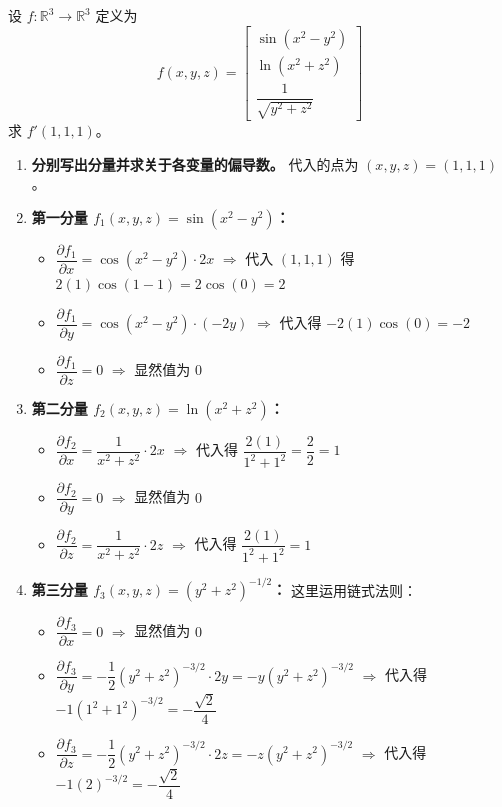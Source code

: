 \documentclass[lang=cn,11pt]{elegantbook}
\begin{document}
\begin{exercise}
设 $f:\mathbb{R}^3\to\mathbb{R}^3$ 定义为 
\[
f(x,y,z) = \begin{bmatrix} \sin(x^2-y^2) \\ \ln(x^2+z^2) \\ \dfrac{1}{\sqrt{y^2+z^2}} \end{bmatrix}
\]
求 $f'(1,1,1)$。
\end{exercise}
\begin{solution}
\begin{enumerate}
  \item \textbf{分别写出分量并求关于各变量的偏导数。}
  代入的点为 $(x, y, z) = (1, 1, 1)$。
  
  \item \textbf{第一分量 $f_1(x,y,z) = \sin(x^2-y^2)$：}
  \begin{itemize}
    \item $\dfrac{\partial f_1}{\partial x} = \cos(x^2-y^2) \cdot 2x$ \quad $\Rightarrow$ \quad 代入 $(1,1,1)$ 得 $2(1)\cos(1-1) = 2\cos(0) = 2$
    \item $\dfrac{\partial f_1}{\partial y} = \cos(x^2-y^2) \cdot (-2y)$ \quad $\Rightarrow$ \quad 代入得 $-2(1)\cos(0) = -2$
    \item $\dfrac{\partial f_1}{\partial z} = 0$ \quad $\Rightarrow$ \quad 显然值为 $0$
  \end{itemize}
  
  \item \textbf{第二分量 $f_2(x,y,z) = \ln(x^2+z^2)$：}
  \begin{itemize}
    \item $\dfrac{\partial f_2}{\partial x} = \dfrac{1}{x^2+z^2} \cdot 2x$ \quad $\Rightarrow$ \quad 代入得 $\dfrac{2(1)}{1^2+1^2} = \dfrac{2}{2} = 1$
    \item $\dfrac{\partial f_2}{\partial y} = 0$ \quad $\Rightarrow$ \quad 显然值为 $0$
    \item $\dfrac{\partial f_2}{\partial z} = \dfrac{1}{x^2+z^2} \cdot 2z$ \quad $\Rightarrow$ \quad 代入得 $\dfrac{2(1)}{1^2+1^2} = 1$
  \end{itemize}
  
  \item \textbf{第三分量 $f_3(x,y,z) = (y^2+z^2)^{-1/2}$：}
  这里运用链式法则：
  \begin{itemize}
    \item $\dfrac{\partial f_3}{\partial x} = 0$ \quad $\Rightarrow$ \quad 显然值为 $0$
    \item $\dfrac{\partial f_3}{\partial y} = -\dfrac{1}{2}(y^2+z^2)^{-3/2} \cdot 2y = -y(y^2+z^2)^{-3/2}$ \quad $\Rightarrow$ \quad 代入得 $-1(1^2+1^2)^{-3/2}  = -\dfrac{\sqrt{2}}{4}$
    \item $\dfrac{\partial f_3}{\partial z} = -\dfrac{1}{2}(y^2+z^2)^{-3/2} \cdot 2z = -z(y^2+z^2)^{-3/2}$ \quad $\Rightarrow$ \quad 代入得 $-1(2)^{-3/2} = -\dfrac{\sqrt{2}}{4}$
  \end{itemize}
  

\end{enumerate}
\end{solution}
\end{document}
